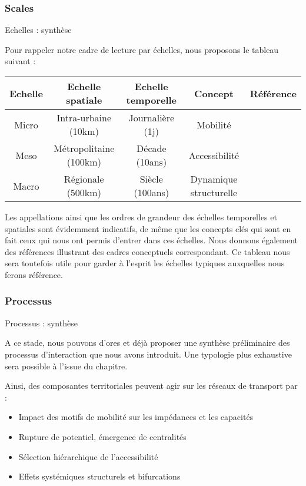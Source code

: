 \subsubsection{Scales}{Echelles : synthèse}


Pour rappeler notre cadre de lecture par échelles, nous proposons le tableau suivant :

{\centering
\medskip
\begin{table}
\begin{tabular}{|c|c|c|c|c|}\hline
	Echelle & Echelle spatiale & Echelle temporelle & Concept & Référence \\ \hline
	Micro & Intra-urbaine (10km) & Journalière (1j) & Mobilité & \cite{hall2005reconsidering} \\ \hline
	Meso & Métropolitaine (100km) & Décade (10ans) & Accessibilité & \cite{wegener2004land} \\\hline
	Macro & Régionale (500km) & Siècle (100ans) & Dynamique structurelle & \cite{pumain1997pour} \\\hline
\end{tabular}
\end{table}
\medskip
}

Les appellations ainsi que les ordres de grandeur des échelles temporelles et spatiales sont évidemment indicatifs, de même que les concepts clés qui sont en fait ceux qui nous ont permis d'entrer dans ces échelles. Nous donnons également des références illustrant des cadres conceptuels correspondant. Ce tableau nous sera toutefois utile pour garder à l'esprit les échelles typiques auxquelles nous ferons référence.



\subsubsection{Processus}{Processus : synthèse}

A ce stade, nous pouvons d'ores et déjà proposer une synthèse préliminaire des processus d'interaction que nous avons introduit. Une typologie plus exhaustive sera possible à l'issue du chapitre.

Ainsi, des composantes territoriales peuvent agir sur les réseaux de transport par :

\begin{itemize}
	\item Impact des motifs de mobilité sur les impédances et les capacités
	\item Rupture de potentiel, émergence de centralités
	\item Sélection hiérarchique de l'accessibilité
	\item Effets systémiques structurels et bifurcations
\end{itemize}

